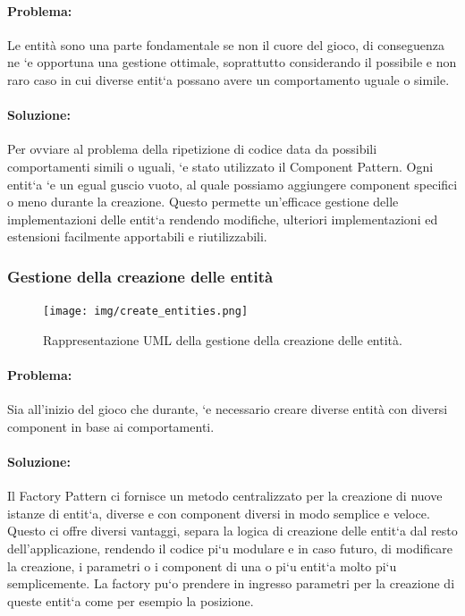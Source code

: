 \paragraph{Problema:}
Le entità sono una parte fondamentale se non il cuore del gioco, di conseguenza ne `e opportuna una gestione ottimale, soprattutto considerando il possibile e non raro caso in cui diverse entit`a possano avere un comportamento uguale o simile.

\paragraph{Soluzione:}
Per ovviare al problema della ripetizione di codice data da possibili comportamenti simili o uguali, `e stato utilizzato il Component Pattern. Ogni entit`a `e un egual guscio vuoto, al quale possiamo aggiungere component specifici o meno durante la creazione. Questo permette un’efficace gestione delle implementazioni delle entit`a rendendo modifiche, ulteriori implementazioni ed estensioni facilmente apportabili e riutilizzabili.

\subsubsection{Gestione della creazione delle entità}

\begin{figure}[H]
\centering{}
\texttt{[image: img/create\_entities.png]}
\caption{Rappresentazione UML della gestione della creazione delle entità.}
\end{figure}

\paragraph{Problema:}
Sia all’inizio del gioco che durante, `e necessario creare diverse entità con diversi component in base ai comportamenti.

\paragraph{Soluzione:}
Il Factory Pattern ci fornisce un metodo centralizzato per la creazione di nuove istanze di entit`a, diverse e con component diversi in modo semplice e veloce. Questo ci offre diversi vantaggi, separa la logica di creazione delle entit`a dal resto dell’applicazione, rendendo il codice pi`u modulare e in caso futuro, di modificare la creazione, i parametri o i component di una o pi`u entit`a molto pi`u semplicemente. La factory pu`o prendere in ingresso parametri per la creazione di queste entit`a come per esempio la posizione.

